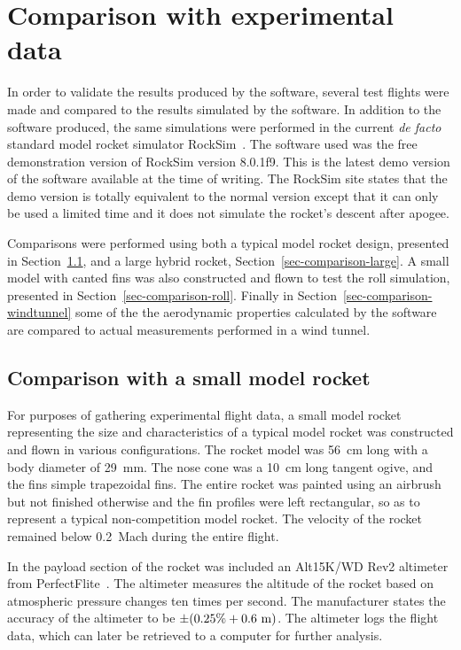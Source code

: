 
\chapter{Comparison with experimental data}
\label{chap-experimental}

In order to validate the results produced by the software, several
test flights were made and compared to the results simulated by the
software.  In addition to the software produced, the same simulations
were performed in the current {\it de facto} standard model rocket simulator
RockSim~\cite{rocksim}.  The software used was the free demonstration
version of RockSim version 8.0.1f9.  This is the latest demo version
of the software available at the time of writing.  The RockSim site
states that the demo version is totally equivalent to the normal
version except that it can only be used a limited time and it does not
simulate the rocket's descent after apogee.

Comparisons were performed using both a typical model rocket design,
presented in Section~\ref{sec-comparison-small}, and a large hybrid
rocket, Section~\ref{sec-comparison-large}.  A small model with
canted fins was also constructed and flown to test the roll
simulation, presented in Section~\ref{sec-comparison-roll}.  Finally
in Section~\ref{sec-comparison-windtunnel} some of the the aerodynamic
properties calculated by the software are compared to actual
measurements performed in a wind tunnel.




\section{Comparison with a small model rocket}
\label{sec-comparison-small}

For purposes of gathering experimental flight data, a small model
rocket representing the size and characteristics of a typical model
rocket was constructed and flown in various configurations.  The
rocket model was 56~cm long with a body diameter of 29~mm.  The nose
cone was a 10~cm long tangent ogive, and the fins simple trapezoidal
fins.  The entire rocket was painted using an airbrush but not
finished otherwise and the fin profiles were left rectangular, so as
to represent a typical non-competition model rocket.  The velocity of
the rocket remained below 0.2~Mach during the entire flight.

In the payload section of the rocket was included an Alt15K/WD Rev2
altimeter from PerfectFlite~\cite{perfectflite}.  The altimeter
measures the altitude of the rocket based on atmospheric pressure
changes ten times per second. The manufacturer states the accuracy of
the altimeter to be $\pm (0.25\% + \rm 0.6~m)$.  The altimeter logs
the flight data, which can later be retrieved to a computer for
further analysis. 

